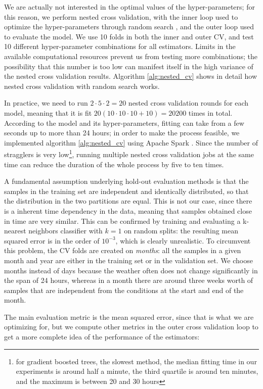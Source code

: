 \documentclass[a4paper]{book}
\begin{document}
We are actually not interested in the optimal values of the hyper-parameters; for this reason, we perform nested cross validation, with the inner loop used to optimize the hyper-parameters through random search \citep{random_search}, and the outer loop used to evaluate the model. We use 10 folds in both the inner and outer CV, and test 10 different hyper-parameter combinations for all estimators. Limits in the available computational resources prevent us from testing more combinations; the possibility that this number is too low can manifest itself in the high variance of the nested cross validation results. Algorithm \ref{alg:nested_cv} shows in detail how nested cross validation with random search works.

In practice, we need to run $2\cdot5\cdot2=20$ nested cross validation rounds for each model, meaning that it is fit $20(10\cdot10\cdot10+10)=20200$ times in total. According to the model and its hyper-parameters, fitting can take from a few seconds up to more than 24 hours; in order to make the process feasible, we implemented algorithm \ref{alg:nested_cv} using Apache Spark \citep{spark}. Since the number of stragglers is very low\footnote{for gradient boosted trees, the slowest method, the median fitting time in our experiments is around half a minute, the third quartile is around ten minutes, and the maximum is between 20 and 30 hours}, running multiple nested cross validation jobs at the same time can reduce the duration of the whole process by five to ten times.

A fundamental assumption underlying hold-out evaluation methods is that the samples in the training set are independent and identically distributed, so that the distribution in the two partitions are equal. This is not our case, since there is a inherent time dependency in the data, meaning that samples obtained close in time are very similar. This can be confirmed by training and evaluating a k-nearest neighbors classifier with $k=1$ on random splits: the resulting mean squared error is in the order of $10^{-3}$, which is clearly unrealistic. To circumvent this problem, the CV folds are created on \emph{months}: all the samples in a given month and year are either in the training set or in the validation set. We choose months instead of days because the weather often does not change significantly in the span of 24 hours, whereas in a month there are around three weeks worth of samples that are independent from the conditions at the start and end of the month.

The main evaluation metric is the mean squared error, since that is what we are optimizing for, but we compute other metrics in the outer cross validation loop to get a more complete idea of the performance of the estimators:
\end{document}
